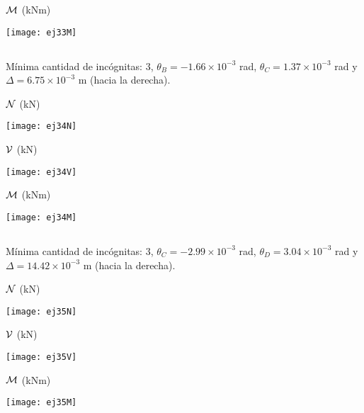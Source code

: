 ${\mathcal M}$ (kNm)

	\begin{center}
	\texttt{[image: ej33M]}
\end{center}



\subsection{}

Mínima cantidad de incógnitas: 3, $\theta_B = -1.66 \times 10^{-3}$ rad, $\theta_C = 1.37 \times 10^{-3}$ rad y $\Delta = 6.75 \times 10^{-3}$ m (hacia la derecha).


${\mathcal N}$ (kN)

\begin{center}
	\texttt{[image: ej34N]}
\end{center}

${\mathcal V}$ (kN)

\begin{center}
	\texttt{[image: ej34V]}
\end{center}

${\mathcal M}$ (kNm)

\begin{center}
	\texttt{[image: ej34M]}
\end{center}



\subsection{}

Mínima cantidad de incógnitas: 3, $\theta_C = -2.99 \times 10^{-3}$ rad, $ \theta_D = 3.04 \times 10^{-3}$ rad y $\Delta  = 14.42 \times 10^{-3}$ m (hacia la derecha).
%

${\mathcal N}$ (kN)

\begin{center}
	\texttt{[image: ej35N]}
\end{center}

${\mathcal V}$ (kN)

\begin{center}
	\texttt{[image: ej35V]}
\end{center}

${\mathcal M}$ (kNm)

\begin{center}
	\texttt{[image: ej35M]}
\end{center}




